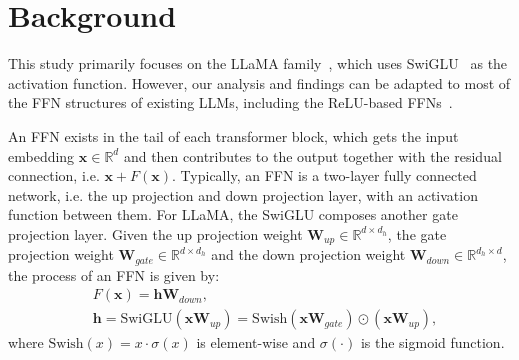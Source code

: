 \section{Background}

This study primarily focuses on the LLaMA family~\cite{touvron2023llama, dubey2024llama}, which uses SwiGLU~\cite{shazeer2020glu} as the activation function. However, our analysis and findings can be adapted to most of the FFN structures of existing LLMs, including the ReLU-based FFNs~\cite{nair2010rectified}.

An FFN exists in the tail of each transformer block, which gets the input embedding $\mathbf{x}\in \mathbb{R}^{d}$ and then contributes to the output together with the residual connection, i.e. $\mathbf{x} + F(\mathbf{x})$.
Typically, an FFN is a two-layer fully connected network, i.e. the up projection and down projection layer, with an activation function between them.
For LLaMA, the SwiGLU composes another gate projection layer.
Given the up projection weight $\mathbf{W}_{up}\in \mathbb{R}^{d \times d_h}$, the gate projection weight $\mathbf{W}_{gate} \in \mathbb{R}^{d \times d_h}$ and the down projection weight $\mathbf{W}_{down} \in \mathbb{R}^{d_h \times d}$, the process of an FFN is given by:
\begin{equation}\label{eq:ori_ffn}
\begin{aligned}
    & F(\mathbf{x}) = \mathbf{h}\mathbf{W}_{down}, \\
    & \mathbf{h}    \!=\! \text{SwiGLU}(\mathbf{x}\mathbf{W}_{up}) \!=\! \text{Swish} (\mathbf{x}\mathbf{W}_{gate}) \odot (\mathbf{x}\mathbf{W}_{up}),
\end{aligned}
\end{equation}
where $\text{Swish}(x) = x \cdot\sigma(x)$ is element-wise and $\sigma(\cdot)$ is the sigmoid function.

